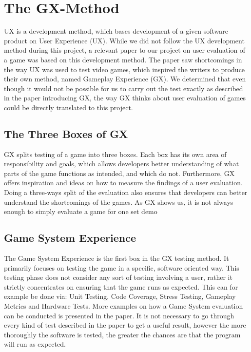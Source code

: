 \section{The GX-Method}
\label{sec:gx_ux_method}
UX is a development method, which bases development of a given software product on User Experience (UX).
While we did not follow the UX development method during this project, a relevant paper to our project on user evaluation of a game was based on this development method.
The paper saw shortcomings in the way UX was used to test video games, which inspired the writers to produce their own method, named Gameplay Experience (GX).
We determined that even though it would not be possible for us to carry out the test exactly as described in the paper introducing GX, the way GX thinks about user evaluation of games could be directly translated to this project\cite{gxmethod}.

\subsection{The Three Boxes of GX}
GX splits testing of a game into three boxes.
Each box has its own area of responsibility and goals, which allows developers better understanding of what parts of the game functions as intended, and which do not.
Furthermore, GX offers inspiration and ideas on how to measure the findings of a user evaluation.
Doing a three-ways split of the evaluation also ensures that developers can better understand the shortcomings of the games.
As GX shows us, it is not always enough to simply evaluate a game for one set demo

\subsection{Game System Experience}
The Game System Experience is the first box in the GX testing method.
It primarily focuses on testing the game in a specific, software oriented way.
This testing phase does not consider any sort of testing involving a user, rather it strictly concentrates on ensuring that the game runs as expected.
This can for example be done via: Unit Testing, Code Coverage, Stress Testing, Gameplay Metrics and Hardware Tests.
More examples on how a Game System evaluation can be conducted is presented in the paper\cite{gxmethod}.
It is not necessary to go through every kind of test described in the paper to get a useful result, however the more thoroughly the software is tested, the greater the chances are that the program will run as expected.

